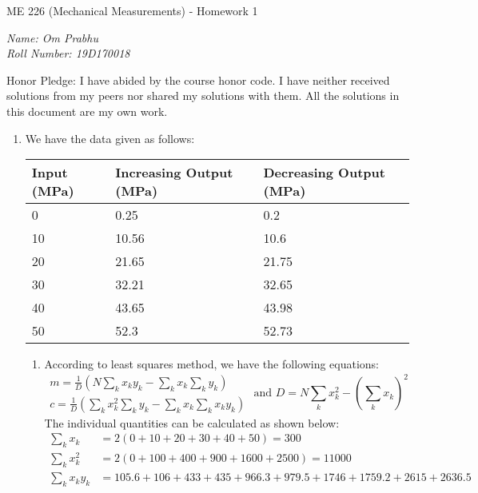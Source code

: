\documentclass[a4paper, 11pt]{article}
\begin{document}
\begin{center}
	{\Large \sc ME 226 (Mechanical Measurements) - Homework 1}
\end{center}
\textit{Name: Om Prabhu\\
Roll Number: 19D170018}
\vspace{2mm}

Honor Pledge: I have abided by the course honor code. I have neither received solutions from my peers nor shared my solutions with them. All the solutions in this document are my own work.
\vspace{-1.5mm}

\hrulefill
\vspace{2mm}

\begin{enumerate}[label=(\arabic*),leftmargin=*]
	\item We have the data given as follows:
\begin{center}
\begin{tabular}{|l|l|l|}
	\hline
	Input (MPa) & Increasing Output (MPa) & Decreasing Output (MPa)\\
	\hline
	0 & 0.25 & 0.2\\
	\hline
	10 & 10.56 & 10.6\\
	\hline
	20 & 21.65 & 21.75\\
	\hline
	30 & 32.21 & 32.65\\
	\hline
	40 & 43.65 & 43.98\\
	\hline
	50 & 52.3 & 52.73\\
	\hline
\end{tabular}
\end{center}
\begin{enumerate}[label=\roman*)]
	\itemsep1em
	\item According to least squares method, we have the following equations:
	$$\begin{array}{l}
		\displaystyle m=\frac{1}{D}\left(N\sum_k x_ky_k-\sum_k x_k\sum_k y_k\right)\\
		\displaystyle c=\frac{1}{D}\left(\sum_k x_k^2\sum_k y_k-\sum_k x_k\sum_k x_ky_k\right)
	\end{array} \text{ and } D=N\sum_k x_k^2-\left(\sum_k x_k\right)^2$$
The individual quantities can be calculated as shown below:
\begin{align*}
	\sum_k x_k&=2(0+10+20+30+40+50)=300\\ 
	\sum_k x_k^2&=2(0+100+400+900+1600+2500)=11000\\
	\sum_k x_ky_k&=105.6+106+433+435+966.3+979.5+1746+1759.2+2615+2636.5\\

\end{align*}
\end{enumerate}
\end{enumerate}
\end{document}
